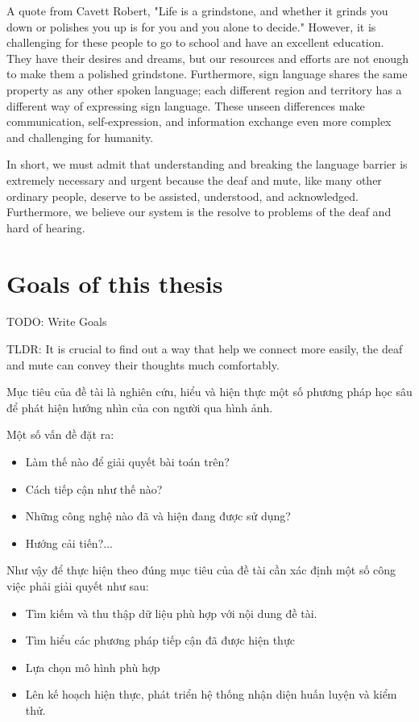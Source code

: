 A quote from Cavett Robert, "Life is a grindstone, and whether it grinds you down or polishes you up is for you and you alone to decide." However, it is challenging for these people to go to school and have an excellent education. They have their desires and dreams, but our resources and efforts are not enough to make them a polished grindstone. Furthermore, sign language shares the same property as any other spoken language; each different region and territory has a different way of expressing sign language. These unseen differences make communication, self-expression, and information exchange even more complex and challenging for humanity.

In short, we must admit that understanding and breaking the language barrier is extremely necessary and urgent because the deaf and mute, like many other ordinary people, deserve to be assisted, understood, and acknowledged. Furthermore, we believe our system is the resolve to problems of the deaf and hard of hearing.

\section{Goals of this thesis}

TODO: Write Goals

TLDR: It is crucial to find out a way that help we connect more easily, the deaf and mute can convey their thoughts much comfortably.

Mục tiêu của đề tài là nghiên cứu, hiểu và hiện thực một số phương pháp học sâu để phát hiện hướng nhìn của con người qua hình ảnh.

Một số vấn đề đặt ra: 
\begin{itemize}
  \item Làm thế nào để giải quyết bài toán trên?
  \item Cách tiếp cận như thế nào?
  \item Những công nghệ nào đã và hiện đang được sử dụng?
  \item Hướng cải tiến?...
\end{itemize}

Như vậy để thực hiện theo đúng mục tiêu của đề tài cần xác định một số công việc phải giải quyết như sau:
\begin{itemize}
  \item Tìm kiếm và thu thập dữ liệu phù hợp với nội dung đề tài.
  \item Tìm hiểu các phương pháp tiếp cận đã được hiện thực
  \item Lựa chọn mô hình phù hợp
  \item Lên kế hoạch hiện thực, phát triển hệ thống nhận diện huấn luyện và kiểm thử.
\end{itemize}

